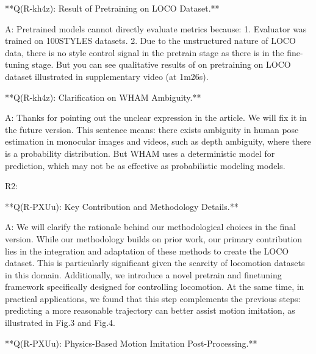 \documentclass{article}
\begin{document}
\begin{markdown}
**Q(R-kh4z): Result of Pretraining on LOCO Dataset.**

A: Pretrained models cannot directly evaluate metrics because: 1. Evaluator was trained on 100STYLES datasets. 2. Due to the unstructured nature of LOCO data, there is no style control signal in the pretrain stage as there is in the fine-tuning stage. But you can see qualitative results of on pretraining on LOCO dataset illustrated in supplementary video (at 1m26s).

**Q(R-kh4z): Clarification on WHAM Ambiguity.**

A: Thanks for pointing out the unclear expression in the article. We will fix it in the future version. This sentence means: there exists ambiguity in human pose estimation in monocular images and videos, such as depth ambiguity, where there is a probability distribution. But WHAM uses a deterministic model for prediction, which may not be as effective as probabilistic modeling models.





R2:


**Q(R-PXUu): Key Contribution and Methodology Details.**

A: We will clarify the rationale behind our methodological choices in the final version. While our methodology builds on prior work, our primary contribution lies in the integration and adaptation of these methods to create the LOCO dataset. This is particularly significant given the scarcity of locomotion datasets in this domain. Additionally, we introduce a novel pretrain and finetuning framework specifically designed for controlling locomotion. At the same time, in practical applications, we found that this step complements the previous steps: predicting a more reasonable trajectory can better assist motion imitation, as illustrated in Fig.3 and Fig.4.




**Q(R-PXUu): Physics-Based Motion Imitation Post-Processing.**


\end{markdown}
\end{document}
